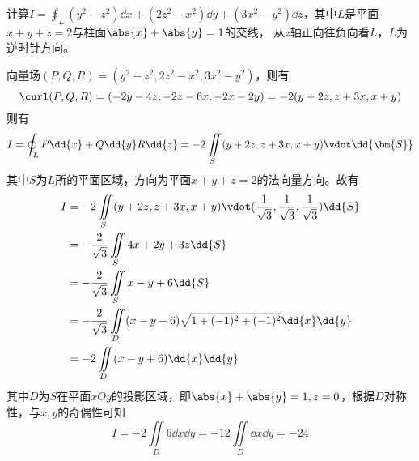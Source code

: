 \begin{example}
    计算$\displaystyle I=\oint_L (y^2-z^2)\dd{x} + (2z^2-x^2)\dd{y} + (3x^2-y^2)\dd{z}$，其中$L$是平面$x+y+z=2$与柱面$\abs{x}+\abs{y}=1$的交线，
    从$z$轴正向往负向看$L$，$L$为逆时针方向。
\end{example}
\begin{solution}
    向量场$(P,Q,R)=(y^2-z^2, 2z^2-x^2, 3x^2-y^2)$，则有
    \[ \curl(P,Q,R) = (-2y-4z, -2z-6x, -2x-2y) = -2(y+2z, z+3x, x+y) \]
    则有
    \[
        I = \oint_L P\dd{x} + Q\dd{y} R\dd{z}= -2\iint\limits_S (y+2z, z+3x, x+y)\vdot \dd{\bm{S}}
    \]
    其中$S$为$L$所的平面区域，方向为平面$x+y+z=2$的法向量方向。故有
    \begin{align*}
        I & = -2\iint\limits_S (y+2z, z+3x, x+y)\vdot(\frac{1}{\sqrt{3}},\frac{1}{\sqrt{3}},\frac{1}{\sqrt{3}})\dd{S} \\
          & =-\frac{2}{\sqrt{3}} \iint\limits_S 4x+2y+3z \dd{S}                                                       \\
          & =-\frac{2}{\sqrt{3}} \iint\limits_S x - y +6 \dd{S}                                                       \\
          & =-\frac{2}{\sqrt{3}} \iint\limits_D (x - y +6)\sqrt{1+(-1)^2+(-1)^2} \dd{x}\dd{y}                         \\
          & = -2 \iint\limits_D (x - y +6) \dd{x}\dd{y}                                                               \\
    \end{align*}
    其中$D$为$S$在平面$xOy$的投影区域，即$\abs{x}+\abs{y}=1, z=0$，根据$D$对称性，与$x,y$的奇偶性可知
    \[ I = -2 \iint\limits_D 6 \dd{x}\dd{y} = -12 \iint\limits_D \dd{x}\dd{y} = -24 \]
\end{solution}


